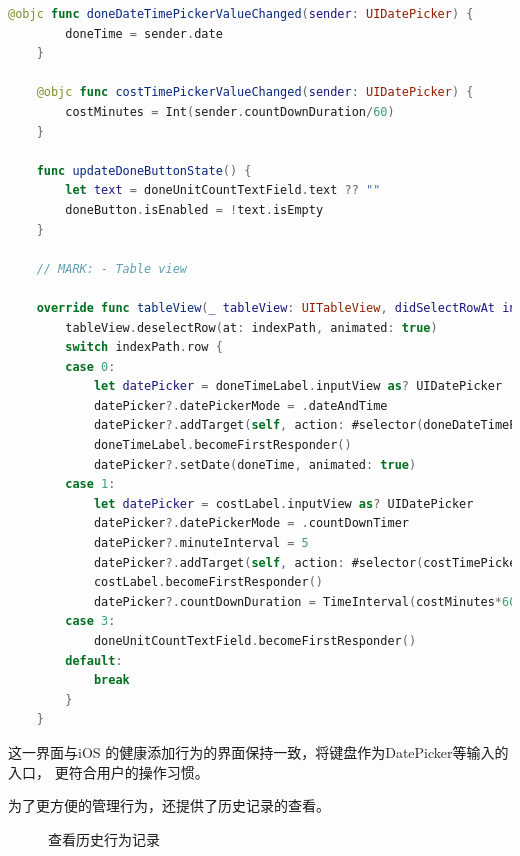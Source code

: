 \begin{lstlisting}[language={Swift}, caption={添加行为的代码}]
    @objc func doneDateTimePickerValueChanged(sender: UIDatePicker) {
        doneTime = sender.date
    }
    
    @objc func costTimePickerValueChanged(sender: UIDatePicker) {
        costMinutes = Int(sender.countDownDuration/60)
    }
    
    func updateDoneButtonState() {
        let text = doneUnitCountTextField.text ?? ""
        doneButton.isEnabled = !text.isEmpty
    }
    
    // MARK: - Table view
    
    override func tableView(_ tableView: UITableView, didSelectRowAt indexPath: IndexPath) {
        tableView.deselectRow(at: indexPath, animated: true)
        switch indexPath.row {
        case 0:
            let datePicker = doneTimeLabel.inputView as? UIDatePicker
            datePicker?.datePickerMode = .dateAndTime
            datePicker?.addTarget(self, action: #selector(doneDateTimePickerValueChanged(sender:)), for: .valueChanged)
            doneTimeLabel.becomeFirstResponder()
            datePicker?.setDate(doneTime, animated: true)
        case 1:
            let datePicker = costLabel.inputView as? UIDatePicker
            datePicker?.datePickerMode = .countDownTimer
            datePicker?.minuteInterval = 5
            datePicker?.addTarget(self, action: #selector(costTimePickerValueChanged(sender:)), for: .valueChanged)
            costLabel.becomeFirstResponder()
            datePicker?.countDownDuration = TimeInterval(costMinutes*60)
        case 3:
            doneUnitCountTextField.becomeFirstResponder()
        default:
            break
        }
    }
\end{lstlisting}

这一界面与iOS 的健康添加行为的界面保持一致，将键盘作为DatePicker等输入的入口，
更符合用户的操作习惯。

为了更方便的管理行为，还提供了历史记录的查看。

\begin{figure}[H]
	\centering
	\caption{查看历史行为记录}
\end{figure}